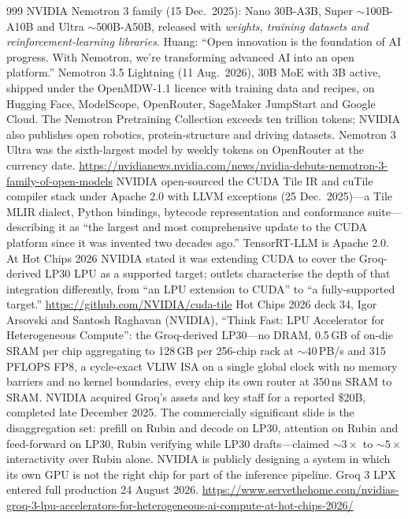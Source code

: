 \begin{thebibliography}{999}
 NVIDIA Nemotron 3 family (15 Dec.\ 2025): Nano 30B-A3B, Super $\sim$100B-A10B and Ultra $\sim$500B-A50B, released with \emph{weights, training datasets and reinforcement-learning libraries}. Huang: ``Open innovation is the foundation of AI progress. With Nemotron, we're transforming advanced AI into an open platform.'' Nemotron 3.5 Lightning (11 Aug.\ 2026), 30B MoE with 3B active, shipped under the OpenMDW-1.1 licence with training data and recipes, on Hugging Face, ModelScope, OpenRouter, SageMaker JumpStart and Google Cloud. The Nemotron Pretraining Collection exceeds ten trillion tokens; NVIDIA also publishes open robotics, protein-structure and driving datasets. Nemotron 3 Ultra was the sixth-largest model by weekly tokens on OpenRouter at the currency date. \url{https://nvidianews.nvidia.com/news/nvidia-debuts-nemotron-3-family-of-open-models}
 NVIDIA open-sourced the CUDA Tile IR and cuTile compiler stack under Apache 2.0 with LLVM exceptions (25 Dec.\ 2025)---a Tile MLIR dialect, Python bindings, bytecode representation and conformance suite---describing it as ``the largest and most comprehensive update to the CUDA platform since it was invented two decades ago.'' TensorRT-LLM is Apache 2.0. At Hot Chips 2026 NVIDIA stated it was extending CUDA to cover the Groq-derived LP30 LPU as a supported target; outlets characterise the depth of that integration differently, from ``an LPU extension to CUDA'' to ``a fully-supported target.'' \url{https://github.com/NVIDIA/cuda-tile}
 Hot Chips 2026 deck 34, Igor Arsovski and Santosh Raghavan (NVIDIA), ``Think Fast: LPU Accelerator for Heterogeneous Compute'': the Groq-derived LP30---no DRAM, 0.5\,GB of on-die SRAM per chip aggregating to 128\,GB per 256-chip rack at $\sim$40\,PB/s and 315 PFLOPS FP8, a cycle-exact VLIW ISA on a single global clock with no memory barriers and no kernel boundaries, every chip its own router at 350\,ns SRAM to SRAM. NVIDIA acquired Groq's assets and key staff for a reported \$20B, completed late December 2025. The commercially significant slide is the disaggregation set: prefill on Rubin and decode on LP30, attention on Rubin and feed-forward on LP30, Rubin verifying while LP30 drafts---claimed $\sim3\times$ to $\sim5\times$ interactivity over Rubin alone. NVIDIA is publicly designing a system in which its own GPU is not the right chip for part of the inference pipeline. Groq 3 LPX entered full production 24 August 2026. \url{https://www.servethehome.com/nvidias-groq-3-lpu-accelerators-for-heterogeneous-ai-compute-at-hot-chips-2026/}

\end{thebibliography}
